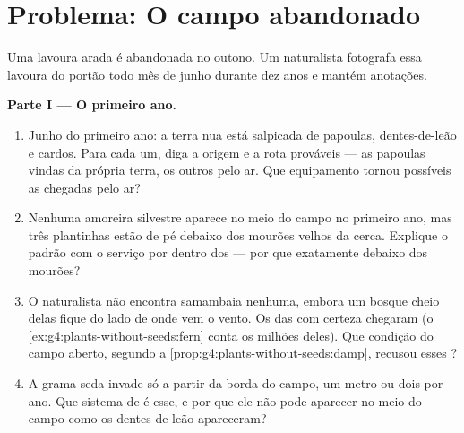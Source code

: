 \section{Problema: O campo abandonado}

\begin{problem}\label{pb:g6:how-plants-spread:1}
Uma lavoura arada é abandonada no outono. Um naturalista fotografa
essa lavoura do portão todo mês de junho durante dez anos e mantém
anotações.

\medskip\noindent\textbf{Parte I --- O primeiro ano.}
\begin{enumerate}
  \item Junho do primeiro ano: a terra nua está salpicada de
        papoulas, dentes-de-leão e cardos. Para cada um, diga a
        origem e a rota prováveis --- as papoulas vindas da própria
        terra, os outros pelo ar. Que equipamento tornou possíveis
        as chegadas pelo ar?
  \item Nenhuma amoreira silvestre aparece no meio do campo no
        primeiro ano, mas três plantinhas estão de pé debaixo dos
        mourões velhos da cerca. Explique o padrão com o serviço por
        dentro dos  --- por que exatamente debaixo dos
        mourões?
  \item O naturalista não encontra samambaia nenhuma, embora um
        bosque cheio delas fique do lado de onde vem o vento. Os
         das  com certeza chegaram (o
        \cref{ex:g4:plants-without-seeds:fern} conta os milhões
        deles). Que condição do campo aberto, segundo a
        \cref{prop:g4:plants-without-seeds:damp}, recusou esses
        ?
  \item A grama-seda invade só a partir da borda do campo, um metro
        ou dois por ano. Que sistema de  é esse, e por
        que ele não pode aparecer no meio do campo como os
        dentes-de-leão apareceram?
\end{enumerate}


\end{problem}
